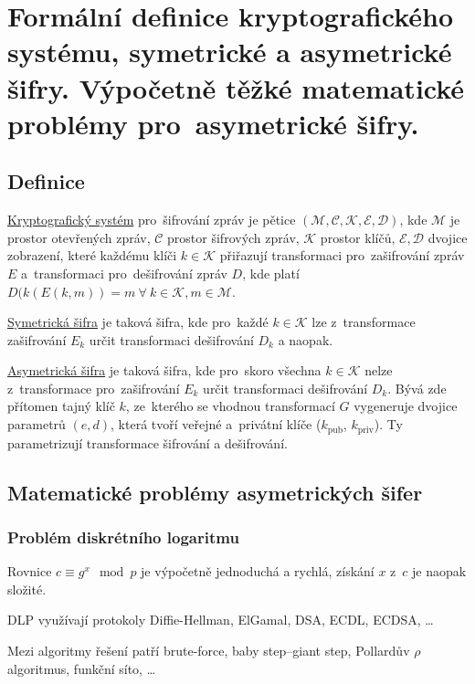 \section{Formální definice kryptografického systému, symetrické a asymetrické šifry. Výpočetně těžké matematické problémy pro~asymetrické šifry.}

\subsection{Definice}

\uline{Kryptografický systém} pro~šifrování zpráv je pětice $(\mathcal{M}, \mathcal{C}, \mathcal{K}, \mathcal{E}, \mathcal{D})$, kde
$\mathcal{M}$ je prostor otevřených zpráv,
$\mathcal{C}$ prostor šifrových zpráv,
$\mathcal{K}$ prostor klíčů,
$\mathcal{E}, \mathcal{D}$ dvojice zobrazení, které každému klíči $k \in \mathcal{K}$ přiřazují transformaci pro~zašifrování zpráv $E$ a~transformaci pro~dešifrování zpráv $D$, kde platí $D(k(E(k,m))=m \ \forall \ k \in \mathcal{K}, m \in \mathcal{M}$.

\uline{Symetrická šifra} je taková šifra, kde pro~každé $k \in \mathcal{K}$ lze z~transformace zašifrování $E_k$ určit transformaci dešifrování $D_k$ a naopak.

\uline{Asymetrická šifra} je taková šifra, kde pro~skoro všechna $k \in \mathcal{K}$ nelze z~transformace pro~zašifrování $E_k$ určit transformaci dešifrování $D_k$.
Bývá zde přítomen tajný klíč $k$, ze~kterého se vhodnou transformací $G$ vygeneruje dvojice parametrů $(e, d)$, která tvoří veřejné a~privátní klíče ($k_\text{pub}$, $k_\text{priv}$).
Ty parametrizují transformace šifrování a dešifrování.

\subsection{Matematické problémy asymetrických šifer}

\subsubsection{Problém diskrétního logaritmu}

Rovnice $c \equiv g^x \mod p$ je výpočetně jednoduchá a rychlá, získání $x$ z~$c$ je naopak složité.

DLP využívají protokoly Diffie-Hellman, ElGamal, DSA, ECDL, ECDSA, \dots

Mezi algoritmy řešení patří brute-force, baby step--giant step, Pollardův $\rho$ algoritmus, funkční síto, \dots

